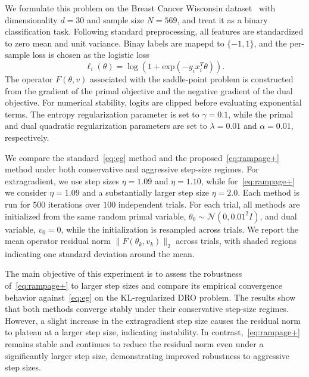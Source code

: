 \documentclass[letter,11pt]{article}
\begin{document}
We formulate this problem on the Breast Cancer Wisconsin dataset~\cite{breast_cancer_wisconsin_diagnostic_17} with dimensionality $d=30$ and sample size $N=569$, and treat it as a binary classification task. Following standard preprocessing, all features are standardized  to zero mean and unit variance. Binay labels are mapepd to $\{-1, 1\}$, and the per-sample loss is chosen as the logistic loss 
\begin{equation}
    \ell_i (\theta) = \log(1 + \mathrm{exp}(-y_ix_i^T\theta)).
\end{equation}The operator $F(\theta, v)$ associated with the saddle-point problem is constructed from the gradient of the primal objective and the negative gradient of the dual objective. For numerical stability, logits are clipped before evaluating exponential terms. The entropy regularization parameter is set to $\gamma=0.1$, while the primal and dual quadratic regularization parameters are set to $\lambda =0.01$ and $\alpha=0.01$, respectively. 

We compare the standard~\eqref{eq:eg} method and the proposed~\eqref{eq:rampage+} method under both conservative and aggressive step-size regimes. For extragradient, we use step sizes $\eta=1.09$ and $\eta=1.10$, while for~\eqref{eq:rampage+} we consider $\eta=1.09$ and a substantially larger step size $\eta=2.0$. Each method is run for $500$ iterations over $100$ independent trials. For each trial, all methods are initialized from the same random primal variable, $\theta_0\sim\mathcal{N}(0,0.01^2I)$, and dual variable, $v_0=0$, while the initialization is resampled across trials. We report the mean operator residual norm $\|F(\theta_k,v_k)\|_2$ across trials, with shaded regions indicating one standard deviation around the mean.

The main objective of this experiment is to assess the robustness of~\eqref{eq:rampage+} to larger step sizes and compare its empirical convergence behavior against~\eqref{eq:eg} on the KL-regularized DRO problem. The results show that both methods converge stably under their conservative step-size regimes. However, a slight increase in the extragradient step size causes the residual norm to plateau at a larger step size, indicating instability. In contrast,~\eqref{eq:rampage+} remains stable and continues to reduce the residual norm even under a significantly larger step size, demonstrating improved robustness to aggressive step sizes.
\end{document}
